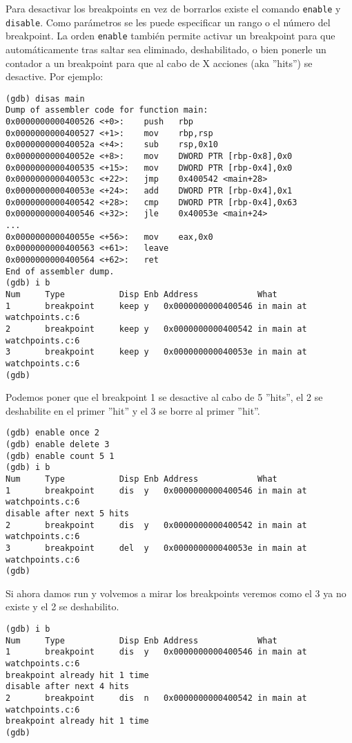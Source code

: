 Para desactivar los breakpoints en vez de borrarlos existe el comando \texttt{enable} y \texttt{disable}. Como parámetros se les puede especificar un rango o el número del breakpoint. La orden \texttt{enable} también permite activar un breakpoint para que automáticamente tras saltar sea eliminado, deshabilitado, o bien ponerle un contador a un breakpoint para que al cabo de X acciones (aka ''hits'') se desactive. Por ejemplo:
\begin{verbatim}
(gdb) disas main
Dump of assembler code for function main:
0x0000000000400526 <+0>:	push   rbp
0x0000000000400527 <+1>:	mov    rbp,rsp
0x000000000040052a <+4>:	sub    rsp,0x10
0x000000000040052e <+8>:	mov    DWORD PTR [rbp-0x8],0x0
0x0000000000400535 <+15>:	mov    DWORD PTR [rbp-0x4],0x0
0x000000000040053c <+22>:	jmp    0x400542 <main+28>
0x000000000040053e <+24>:	add    DWORD PTR [rbp-0x4],0x1
0x0000000000400542 <+28>:	cmp    DWORD PTR [rbp-0x4],0x63
0x0000000000400546 <+32>:	jle    0x40053e <main+24>
...
0x000000000040055e <+56>:	mov    eax,0x0
0x0000000000400563 <+61>:	leave  
0x0000000000400564 <+62>:	ret    
End of assembler dump.
(gdb) i b
Num     Type           Disp Enb Address            What
1       breakpoint     keep y   0x0000000000400546 in main at watchpoints.c:6
2       breakpoint     keep y   0x0000000000400542 in main at watchpoints.c:6
3       breakpoint     keep y   0x000000000040053e in main at watchpoints.c:6
(gdb)
\end{verbatim}
Podemos poner que el breakpoint 1 se desactive al cabo de 5 ''hits'', el 2 se deshabilite en el primer ''hit'' y el 3 se borre al primer ''hit''.
\begin{verbatim}
(gdb) enable once 2
(gdb) enable delete 3
(gdb) enable count 5 1
(gdb) i b
Num     Type           Disp Enb Address            What
1       breakpoint     dis  y   0x0000000000400546 in main at watchpoints.c:6
disable after next 5 hits
2       breakpoint     dis  y   0x0000000000400542 in main at watchpoints.c:6
3       breakpoint     del  y   0x000000000040053e in main at watchpoints.c:6
(gdb) 
\end{verbatim}
Si ahora damos run y volvemos a mirar los breakpoints veremos como el 3 ya no existe y el 2 se deshabilito.
\begin{verbatim}
(gdb) i b
Num     Type           Disp Enb Address            What
1       breakpoint     dis  y   0x0000000000400546 in main at watchpoints.c:6
breakpoint already hit 1 time
disable after next 4 hits
2       breakpoint     dis  n   0x0000000000400542 in main at watchpoints.c:6
breakpoint already hit 1 time
(gdb)
\end{verbatim}